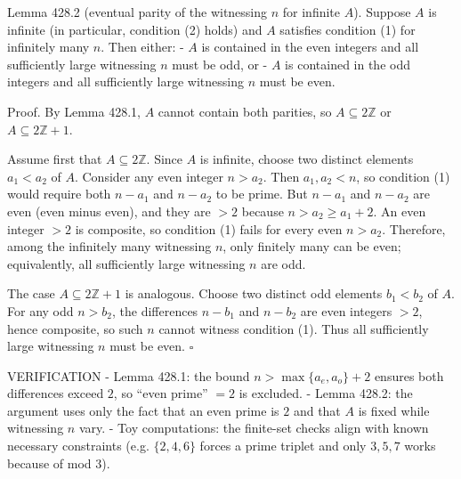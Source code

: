 Lemma 428.2 (eventual parity of the witnessing $n$ for infinite $A$).
Suppose $A$ is infinite (in particular, condition (2) holds) and $A$ satisfies condition (1) for infinitely many $n$.
Then either:
- $A$ is contained in the even integers and all sufficiently large witnessing $n$ must be odd, or
- $A$ is contained in the odd integers and all sufficiently large witnessing $n$ must be even.

Proof.
By Lemma 428.1, $A$ cannot contain both parities, so $A\subseteq 2\mathbb Z$ or $A\subseteq 2\mathbb Z+1$.

Assume first that $A\subseteq 2\mathbb Z$.
Since $A$ is infinite, choose two distinct elements $a_1<a_2$ of $A$.
Consider any even integer $n>a_2$.
Then $a_1,a_2<n$, so condition (1) would require both $n-a_1$ and $n-a_2$ to be prime.
But $n-a_1$ and $n-a_2$ are even (even minus even), and they are $>2$ because $n>a_2\ge a_1+2$.
An even integer $>2$ is composite, so condition (1) fails for every even $n>a_2$.
Therefore, among the infinitely many witnessing $n$, only finitely many can be even; equivalently, all sufficiently large witnessing $n$ are odd.

The case $A\subseteq 2\mathbb Z+1$ is analogous.
Choose two distinct odd elements $b_1<b_2$ of $A$.
For any odd $n>b_2$, the differences $n-b_1$ and $n-b_2$ are even integers $>2$, hence composite, so such $n$ cannot witness condition (1).
Thus all sufficiently large witnessing $n$ must be even.
\hfill $\square$

VERIFICATION
- Lemma 428.1: the bound $n>\max\{a_e,a_o\}+2$ ensures both differences exceed $2$, so “even prime” $=2$ is excluded.
- Lemma 428.2: the argument uses only the fact that an even prime is $2$ and that $A$ is fixed while witnessing $n$ vary.
- Toy computations: the finite-set checks align with known necessary constraints (e.g. $\{2,4,6\}$ forces a prime triplet and only $3,5,7$ works because of mod $3$).

